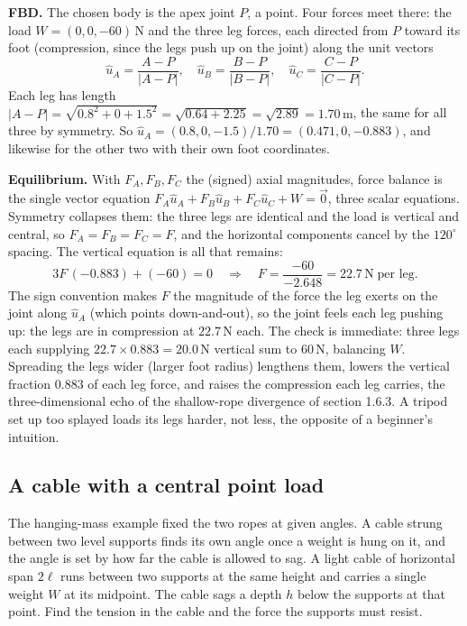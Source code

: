 \textbf{FBD.} The chosen body is the apex joint $P$, a point. Four forces
meet there: the load $W = (0, 0, -60)\,\text{N}$ and the three leg forces,
each directed from $P$ toward its foot (compression, since the legs push
up on the joint) along the unit vectors
\[
\hat{u}_A = \frac{A - P}{|A - P|}, \quad
\hat{u}_B = \frac{B - P}{|B - P|}, \quad
\hat{u}_C = \frac{C - P}{|C - P|}.
\]
Each leg has length $|A - P| = \sqrt{0.8^2 + 0 + 1.5^2} = \sqrt{0.64 +
2.25} = \sqrt{2.89} = 1.70\,\si{\meter}$, the same for all three by
symmetry. So $\hat{u}_A = (0.8, 0, -1.5)/1.70 = (0.471, 0, -0.883)$, and
likewise for the other two with their own foot coordinates.

\textbf{Equilibrium.} With $F_A, F_B, F_C$ the (signed) axial magnitudes,
force balance is the single vector equation $F_A\hat{u}_A + F_B\hat{u}_B +
F_C\hat{u}_C + W = \vec{0}$, three scalar equations. Symmetry collapses
them: the three legs are identical and the load is vertical and central, so
$F_A = F_B = F_C = F$, and the horizontal components cancel by the
$120^{\circ}$ spacing. The vertical equation is all that remains:
\[
3F\,(-0.883) + (-60) = 0
\quad\Longrightarrow\quad
F = \frac{-60}{-2.648} = 22.7\,\text{N} \;\text{per leg}.
\]
The sign convention makes $F$ the magnitude of the force the leg exerts on
the joint along $\hat{u}_A$ (which points down-and-out), so the joint feels
each leg pushing up: the legs are in compression at $22.7\,\text{N}$ each.
The check is immediate: three legs each supplying $22.7 \times 0.883 =
20.0\,\text{N}$ vertical sum to $60\,\text{N}$, balancing $W$. Spreading
the legs wider (larger foot radius) lengthens them, lowers the vertical
fraction $0.883$ of each leg force, and raises the compression each leg
carries, the three-dimensional echo of the shallow-rope divergence of
section 1.6.3. A tripod set up too splayed loads its legs harder, not
less, the opposite of a beginner's intuition.

\subsection{A cable with a central point load}

The hanging-mass example fixed the two ropes at given angles. A cable
strung between two level supports finds its own angle once a weight is hung
on it, and the angle is set by how far the cable is allowed to sag. A light
cable of horizontal span $2\ell$ runs between two supports at the same
height and carries a single weight $W$ at its midpoint. The cable sags a
depth $h$ below the supports at that point. Find the tension in the cable
and the force the supports must resist.

